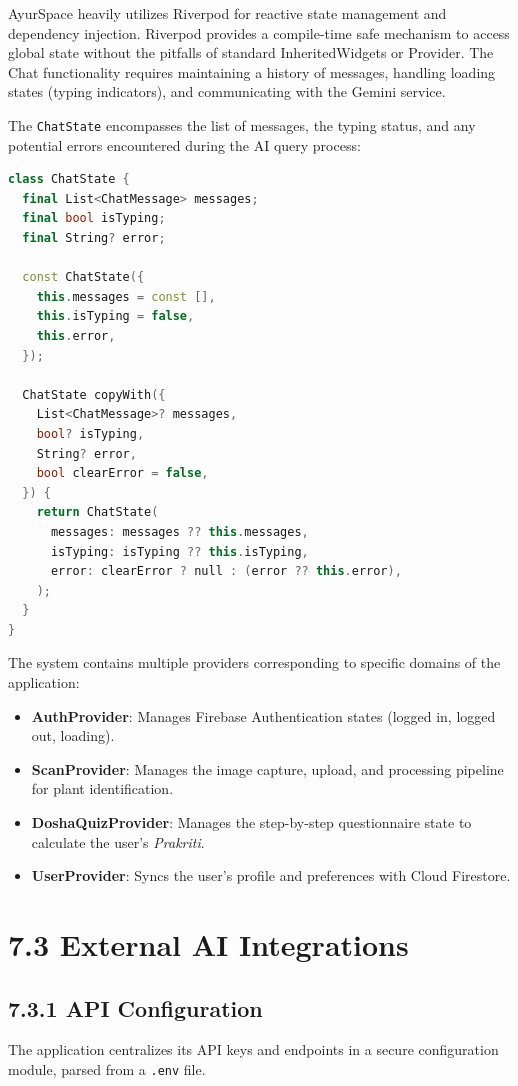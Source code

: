 \documentclass[12pt]{article}
\begin{document}
AyurSpace heavily utilizes Riverpod for reactive state management and dependency injection.
Riverpod provides a compile-time safe mechanism to access global state without the pitfalls of
standard InheritedWidgets or Provider. The Chat functionality requires maintaining a history of
messages, handling loading states (typing indicators), and communicating with the Gemini service.

The \texttt{ChatState} encompasses the list of messages, the typing status, and any potential
errors encountered during the AI query process:

\begin{lstlisting}[language=C++]
class ChatState {
  final List<ChatMessage> messages;
  final bool isTyping;
  final String? error;

  const ChatState({
    this.messages = const [],
    this.isTyping = false,
    this.error,
  });

  ChatState copyWith({
    List<ChatMessage>? messages,
    bool? isTyping,
    String? error,
    bool clearError = false,
  }) {
    return ChatState(
      messages: messages ?? this.messages,
      isTyping: isTyping ?? this.isTyping,
      error: clearError ? null : (error ?? this.error),
    );
  }
}
\end{lstlisting}

The system contains multiple providers corresponding to specific domains of the application:
\begin{itemize}
    \item \textbf{AuthProvider}: Manages Firebase Authentication states (logged in, logged out,
    loading).
    \item \textbf{ScanProvider}: Manages the image capture, upload, and processing pipeline for
    plant identification.
    \item \textbf{DoshaQuizProvider}: Manages the step-by-step questionnaire state to calculate
    the user's \textit{Prakriti}.
    \item \textbf{UserProvider}: Syncs the user's profile and preferences with Cloud Firestore.
\end{itemize}

\newpage

\section*{7.3 \quad External AI Integrations}

\subsection*{7.3.1 \quad API Configuration}
The application centralizes its API keys and endpoints in a secure configuration module, parsed
from a \texttt{.env} file.
\end{document}
